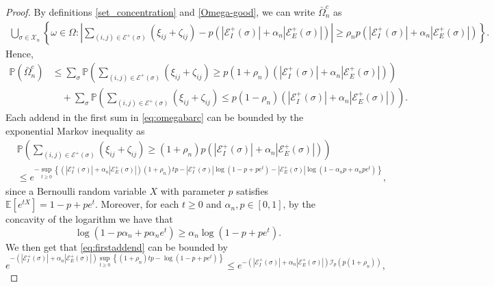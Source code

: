 \documentclass[11pt,oneside]{amsart}
\numberwithin{equation}{section}  %
\theoremstyle{plain}
\theoremstyle{remark}
\def \cE {\mathcal{E}}
\def \s {{\sigma}}
\begin{document}
\begin{proof}
By definitions \eqref{set_concentration} and \eqref{Omega-good}, we can write $\bar{\Omega}^{c}_n$ as
\begin{align*}
    \bigcup_{\sigma \in \mathcal{X}_n} \left \{\omega \in \Omega: \left | \sum_{(i, j)\in \cE^{+}(\sigma) } \!\!\!\!\!\!(\xi_{i j}+\zeta_{i j}) 
     - p(|\cE_{I}^{+}(\s)|+ \alpha_n | \cE_{E}^{+}(\s) |) \right| \geq \rho_n p(|\cE_{I}^{+}(\s)|+ \alpha_n |\cE_{E}^{+}(\s)|) \right \}.
\end{align*}
Hence,
\begin{equation}
\label{eq:omegabarc}
\begin{split}
\mathbb{P}\left(\bar{\Omega}^{c}_n\right) &\leq \sum_\sigma \mathbb{P} \left ( \sum_{(i, j)\in \cE^{+}(\sigma) } (\xi_{i j}+\zeta_{i j}) 
\geq p(1+\rho_n) (|\cE_{I}^{+}(\s)|+ \alpha_n |\cE_{E}^{+}(\s)|) \right ) \\
& \quad + \sum_\sigma \mathbb{P}\left ( \sum_{(i, j)\in \cE^{+}(\sigma) }(\xi_{i j}+\zeta_{i j}) \leq p(1-\rho_n) (|\cE_{I}^{+}(\s)|+ \alpha_n |\cE_{E}^{+}(\s)|) \right ).
\end{split}
\end{equation}
Each addend in the first sum in \eqref{eq:omegabarc} can be bounded by the exponential Markov inequality as
\begin{equation}
\label{eq:firstaddend}
\begin{split}
&\mathbb{P} \left(
\sum_{(i, j)\in \cE^{+}(\sigma) }(\xi_{i j}+\zeta_{i j}) \geq (1+\rho_n)p (|\cE_{I}^{+}(\s)|+ \alpha_n | \cE_{E}^{+} (\s)|) \right ) \\
&\le e^{ -\sup_{t \geq 0} \left \{ (\left|\cE_{I}^{+}(\s)\right|+ \alpha_n \left|\cE_{E}^{+}(\s)\right|)(1+\rho_n) t p- \left|\cE_{I}^{+} (\s)\right|\log \left(1-p+p e^{t}\right)-\left|\cE_{E}^{+}(\s)\right| \log \left(1-\alpha_n p+\alpha_n p e^{t}\right)\right \}},
\end{split}
\end{equation}
since a Bernoulli random variable $X$ with parameter $p$ satisfies $\mathbb{E}\left[e^{t X}\right]=1-p+p e^{t}$. Moreover, for each $t \geq 0$ and $\alpha_n, p \in [0,1]$, by the concavity of the logarithm we have that $$
\log \left(1-p \alpha_n +p \alpha_n e^{t}\right) \geq \alpha_n \log \left(1-p+p e^{t}\right).
$$
We then get that \eqref{eq:firstaddend} can be bounded by
\begin{equation*}
e^{ - (\left|\cE_{I}^{+} (\s)\right|+ \alpha_n \left|\cE_{E}^{+} (\s)\right|)\sup_{t \geq 0} \left \{ (1+\rho_n) t p-\log \left(1-p+p e^{t}\right) \right \} }\leq e^{ - (\left|\cE_{I}^{+}(\s)\right|+ \alpha_n \left|\cE_{E}^{+} (\s)\right|) \mathscr{I}_p (p(1+\rho_n))},

\end{equation*}
\end{proof}
\end{document}

